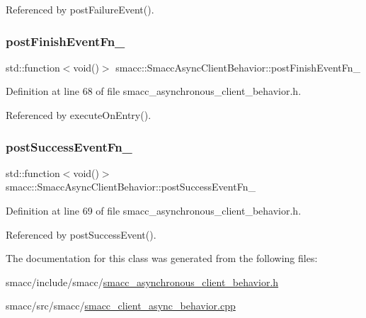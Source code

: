 Referenced by post\+Failure\+Event().

\mbox{\label{classsmacc_1_1SmaccAsyncClientBehavior_af7a9ee952ba3fb8629aa55491606a7b2}} 
\subsubsection{\texorpdfstring{post\+Finish\+Event\+Fn\+\_\+}{postFinishEventFn\_}}
{\footnotesize\ttfamily std\+::function$<$void()$>$ smacc\+::\+Smacc\+Async\+Client\+Behavior\+::post\+Finish\+Event\+Fn\+\_\+\hspace{0.3cm}{\ttfamily [private]}}



Definition at line 68 of file smacc\+\_\+asynchronous\+\_\+client\+\_\+behavior.\+h.



Referenced by execute\+On\+Entry().

\mbox{\label{classsmacc_1_1SmaccAsyncClientBehavior_a944ed10880796d53649bee39dc1299c0}} 
\subsubsection{\texorpdfstring{post\+Success\+Event\+Fn\+\_\+}{postSuccessEventFn\_}}
{\footnotesize\ttfamily std\+::function$<$void()$>$ smacc\+::\+Smacc\+Async\+Client\+Behavior\+::post\+Success\+Event\+Fn\+\_\+\hspace{0.3cm}{\ttfamily [private]}}



Definition at line 69 of file smacc\+\_\+asynchronous\+\_\+client\+\_\+behavior.\+h.



Referenced by post\+Success\+Event().



The documentation for this class was generated from the following files\+:\begin{DoxyCompactItemize}
\item 
smacc/include/smacc/\hyperlink{smacc__asynchronous__client__behavior_8h}{smacc\+\_\+asynchronous\+\_\+client\+\_\+behavior.\+h}\item 
smacc/src/smacc/\hyperlink{smacc__client__async__behavior_8cpp}{smacc\+\_\+client\+\_\+async\+\_\+behavior.\+cpp}\end{DoxyCompactItemize}
